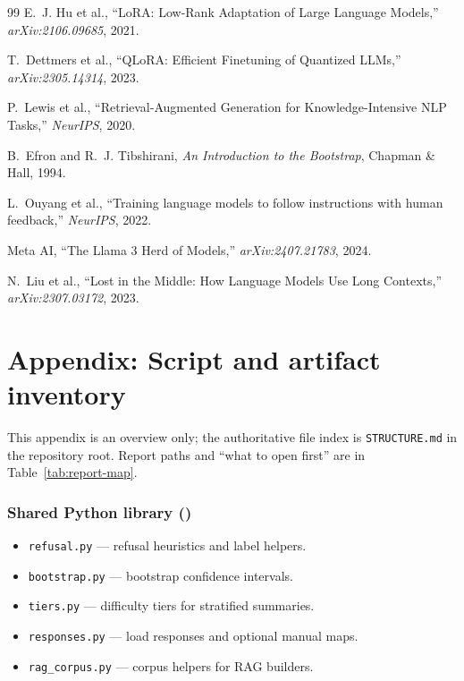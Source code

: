 \documentclass[11pt,a4paper]{article}
\begin{document}
\begin{thebibliography}{99}
E.~J. Hu et al., ``LoRA: Low-Rank Adaptation of Large Language Models,'' \emph{arXiv:2106.09685}, 2021.

T.~Dettmers et al., ``QLoRA: Efficient Finetuning of Quantized LLMs,'' \emph{arXiv:2305.14314}, 2023.

P.~Lewis et al., ``Retrieval-Augmented Generation for Knowledge-Intensive NLP Tasks,'' \emph{NeurIPS}, 2020.

B.~Efron and R.~J. Tibshirani, \emph{An Introduction to the Bootstrap}, Chapman \& Hall, 1994.

L.~Ouyang et al., ``Training language models to follow instructions with human feedback,'' \emph{NeurIPS}, 2022.

Meta AI, ``The Llama 3 Herd of Models,'' \emph{arXiv:2407.21783}, 2024.

N.~Liu et al., ``Lost in the Middle: How Language Models Use Long Contexts,'' \emph{arXiv:2307.03172}, 2023.
\end{thebibliography}

\appendix

\section*{Appendix: Script and artifact inventory}
\label{app:inventory}

\noindent
This appendix is an overview only; the authoritative file index is \texttt{STRUCTURE.md} in the repository root.
Report paths and ``what to open first'' are in Table~\ref{tab:report-map}.

\subsubsection*{Shared Python library ()}
\begin{itemize}[leftmargin=1.35em, itemsep=0.25em, parsep=0pt, topsep=2pt]
  \item \texttt{refusal.py} --- refusal heuristics and label helpers.
  \item \texttt{bootstrap.py} --- bootstrap confidence intervals.
  \item \texttt{tiers.py} --- difficulty tiers for stratified summaries.
  \item \texttt{responses.py} --- load responses and optional manual maps.
  \item \texttt{rag\_corpus.py} --- corpus helpers for RAG builders.
\end{itemize}
\end{document}
